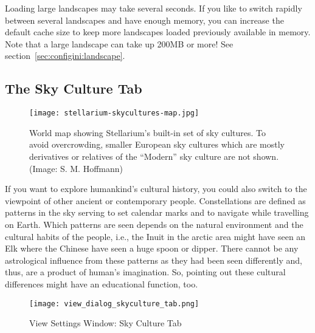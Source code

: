 Loading large landscapes may take several seconds.
If you like to switch rapidly between several landscapes and have enough memory, 
you can increase the default cache size to keep more landscapes loaded previously 
available in memory. Note that a large landscape can take up 200MB or more! 
See section~\ref{sec:configini:landscape}.

\subsection{The Sky Culture Tab}
\label{sec:gui:view:skyculture}


\begin{figure}[th]\centering
\texttt{[image: stellarium-skycultures-map.jpg]}
\caption{World map showing Stellarium's built-in set of
  sky cultures. To avoid overcrowding, smaller European sky cultures
  which are mostly derivatives or relatives of the ``Modern'' sky culture are not
  shown. (Image: S. M. Hoffmann)}
\label{fig:skycultures}
\end{figure}

\noindent If you want to explore humankind's cultural history, you could also
switch to the viewpoint of other ancient or contemporary
people. Constellations are defined as patterns in the sky serving to
set calendar marks and to navigate while travelling on Earth. Which
patterns are seen depends on the natural environment and the cultural
habits of the people, i.e., the Inuit in the arctic area might have
seen an Elk where the Chinese have seen a huge spoon or dipper. There
cannot be any astrological influence from these patterns as they had
been seen differently and, thus, are a product of human's
imagination. So, pointing out these cultural differences might have an
educational function, too.

\noindent%
\colorbox{light-gray}{}


\begin{figure}[htbp]
\centering\texttt{[image: view\_dialog\_skyculture\_tab.png]}
\caption{View Settings Window: Sky Culture Tab}
\label{fig:gui:view:skyculture}
\end{figure}

